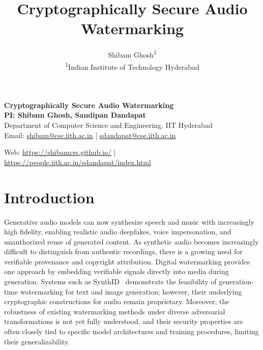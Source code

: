 
\newcommand{\soptitle}{Cryptographically Secure Audio Watermarking}

\title{\sffamily\bfseries\Large\textcolor{theme}{\soptitle}}\par
\author{
	Shibam Ghosh\textsuperscript{1}\\[1ex]
	\normalsize \textsuperscript{1}Indian Institute of Technology Hyderabad 
}

\date{} %


	\begin{tcolorbox}[
		colback=headerbg,
		colframe=headerbg,
		boxrule=0pt,
		width=\textwidth,
		arc=0mm,
		left=6pt,
		right=6pt,
		top=6pt,
		bottom=6pt
		]
		\centering
		{\LARGE \textbf{Cryptographically Secure Audio Watermarking}}\\[6pt]
		
		{\large \textbf{PI: Shibam Ghosh, Sandipan Dandapat}}\\
		{\large Department of Computer Science and Engineering, IIT Hyderabad}\\[4pt]
		
        Email: \href{mailto:shibam@cse.iith.ac.in}{shibam@cse.iith.ac.in}\; | \;\href{mailto:sdandapat@cse.iith.ac.in}{sdandapat@cse.iith.ac.in}
		
		Web: \href{https://shibamcrs.github.io/}{https://shibamcrs.github.io/}\; | \;\href{https://people.iith.ac.in/sdandapat/index.html}{https://people.iith.ac.in/sdandapat/index.html}
	\end{tcolorbox}
	
	\vspace{8pt}
	
	\section{Introduction}
Generative audio models can now synthesize speech and music with increasingly high fidelity, enabling realistic audio deepfakes, voice impersonation, and unauthorized reuse of generated content. As synthetic audio becomes increasingly difficult to distinguish from authentic recordings, there is a growing need for verifiable provenance and copyright attribution.
Digital watermarking provides one approach by embedding verifiable signals directly into media during generation.
Systems such as SynthID~\cite{Dathathri2024SynthID} demonstrate the feasibility of generation-time watermarking for text and image generation; however, their underlying cryptographic constructions for audio remain proprietary.
Moreover, the robustness of existing watermarking methods under diverse adversarial transformations is not yet fully understood, and their security properties are often closely tied to specific model architectures and training procedures, limiting their generalizability.

